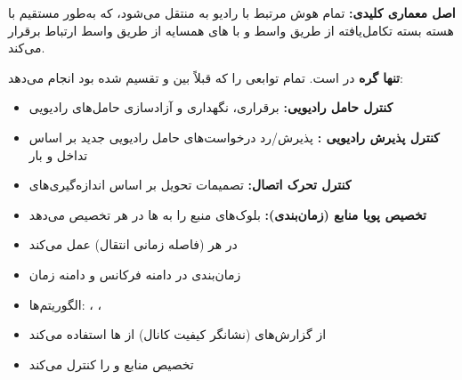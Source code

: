 
\textbf{اصل معماری کلیدی:} تمام هوش مرتبط با رادیو به  منتقل می‌شود، که به‌طور مستقیم با هسته بسته تکامل‌یافته  از طریق واسط  و با های همسایه از طریق واسط  ارتباط برقرار می‌کند.



 \textbf{تنها گره} در  است. تمام توابعی را که قبلاً بین  و  تقسیم شده بود انجام می‌دهد:


\begin{itemize}
\tightlist
\item
  \textbf{کنترل حامل رادیویی:} برقراری، نگهداری و آزادسازی حامل‌های رادیویی
\item
  \textbf{کنترل پذیرش رادیویی :} پذیرش/\allowbreak{}رد درخواست‌های حامل رادیویی جدید بر اساس تداخل و بار
\item
  \textbf{کنترل تحرک اتصال:} تصمیمات تحویل بر اساس اندازه‌گیری‌های 
\item
  \textbf{تخصیص پویا منابع (زمان‌بندی):} بلوک‌های منبع را به ها در هر  تخصیص می‌دهد
\end{itemize}


\begin{itemize}
\tightlist
\item
  در هر  (فاصله زمانی انتقال) عمل می‌کند
\item
  زمان‌بندی در دامنه فرکانس و دامنه زمان
\item
  الگوریتم‌ها: ، ، 
\item
  از گزارش‌های  (نشانگر کیفیت کانال) از ها استفاده می‌کند
\item
  تخصیص منابع  و  را کنترل می‌کند
\end{itemize}


